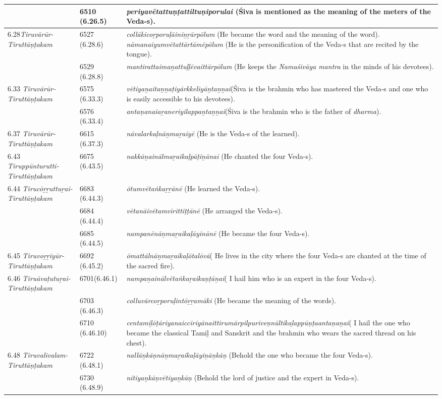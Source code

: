 \begin{longtable}{|m{2.7cm}|m{2.7cm}|>{\raggedright}m{3.1cm}|}
\hline
 & 6510 (6.26.5) & \textit{periyavētattuṇṭattiltu\-ṇiporulai} (Śiva is mentioned  as the meaning of the meters of the Veda-s). \tabularnewline
\hline
6.28\textit{Tiruvārūr- Tiruttāṇṭakam} & 6527 (6.28.6) & \textit{collākicoṟporuḷāiniṉṟār\-pōlum} (He became the word and the meaning of the word). \textit{nāmanaiyumvētattārtāmēpōlum} (He is the personification of the Veda-s that are recited by the tongue). \tabularnewline
\hline
 & 6529 (6.28.8) & \textit{mantirattaimaṉattuḷḷē\-vaittārpōlum} (He keeps the \textit{Namaśivāya mantra} in the minds of his devotees). \tabularnewline
\hline
6.33 \textit{Tiruvārūr- Tiruttāṇṭakam} & 6575 (6.33.3) & \textit{vētiyaṉaitaṉṉaṭiyār\-kkeliyāṉtaṉṉai}(Śiva is the brahmin who has mastered the Veda-s and one who is easily accessible to his devotees). \tabularnewline
\hline
 & 6576 (6.33.4) & \textit{antaṇanaiaṟaneriyila\-ppaṉtaṉṉai}(Śiva is the brahmin who is the father of \textit{dharma}). \tabularnewline
\hline
6.37 \textit{Tiruvārūr- Tiruttāṇṭakam} & 6615 (6.37.3) & \textit{nāvalarkaḷnāṉmaṟaiyē} (He is the Veda-s of the learned). \tabularnewline
\hline
6.43 \textit{Tiruppūnturutti- Tiruttāṇṭakam} & 6675 (6.43.5) & \textit{nakkāṉainālmaṟaikaḷ\-pāṭiṉānai} (He chanted the four Veda-s). \tabularnewline
\hline
6.44 \textit{Tirucōṟṟuttuṟai- Tiruttāṇṭakam} & 6683 (6.44.3) & \textit{ōtumvētaṅkaṟṟānē} (He learned the Veda-s). \tabularnewline
\hline
 & 6684 (6.44.4) & \textit{vētanāivētamvirittiṭṭānē} (He arranged the Veda-s). \tabularnewline
\hline
 & 6685 (6.44.5) & \textit{nampanēnāṉmaṟaika\-ḷāyinānē} (He became the four Veda-s). \tabularnewline
\hline
6.45 \textit{Tiruvoṟṟiyūr- Tiruttāṇṭakam} & 6692 (6.45.2) & \textit{ōmattālnāṉmaṟaikaḷō\-talōvā}( He lives in the city where the four Veda-s are chanted at the time of the sacred fire). \tabularnewline
\hline
6.46 \textit{Tiruāvaṭutuṟai- Tiruttāṇṭakam} & 6701(6.46.1) & \textit{nampaṉainālvētaṅ\-kaṟaikaṇṭāṉai}( I hail him who is an expert in the four Veda-s). \tabularnewline
\hline
 & 6703 (6.46.3) & \textit{colluvārcoṟporuḷintōṟṟa\-māki }(He became the meaning of the words). \tabularnewline
\hline
 & 6710 (6.46.10) & \textit{centamiḻōṭāriyanaiccīri\-yānaittirumārpilpuri\-veṇnūltikaḻappūṇṭaan\-taṇaṉai}( I hail the one who became the  classical Tamiḻ and Sanskrit and the brahmin who wears the sacred thread on his chest). \tabularnewline
\hline
6.48 \textit{Tiruvalivalam- Tiruttāṇṭakam} & 6722 (6.48.1) & \textit{nallāṉkāṇnāṉmaṟai\-kaḷāyiṉāṉkāṇ} (Behold the one who became the four Veda-s). \tabularnewline
\hline
 & 6730 (6.48.9) & \textit{nītiyaṉkāṇvētiyaṉkāṇ} (Behold the lord of justice and the expert in Veda-s). \tabularnewline

\end{longtable}
